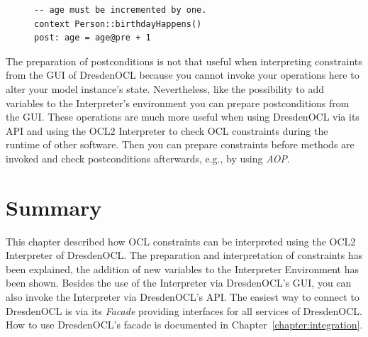 \begin{figure}[!t]
  \lstset{
    language=OCL
  }
  \begin{lstlisting}[caption={An example Postcondition that must be prepared.}, captionpos=b, label=lst:interpret:postcondition]
-- age must be incremented by one.
context Person::birthdayHappens()
post: age = age@pre + 1
  \end{lstlisting}
\end{figure}

The preparation of postconditions is not that useful when interpreting constraints from the GUI of DresdenOCL because you cannot invoke your operations here to alter your model instance's state. Nevertheless, like the possibility to add variables to the Interpreter's environment you can prepare postconditions from the GUI. These operations are much more useful when using DresdenOCL via its API and using the \acs{OCL}2 Interpreter to check \acs{OCL} constraints during the runtime of other software. Then you can prepare constraints before methods are invoked and check postconditions afterwards, e.g., by using \emph{\acf{AOP}}.



\section{Summary}
  
This chapter described how \acs{OCL} constraints can be interpreted using the \acs{OCL}2 Interpreter of DresdenOCL. The preparation and interpretation of constraints has been explained, the addition of new variables to the Interpreter Environment has been shown. Besides the use of the Interpreter via DresdenOCL's GUI, you can also invoke the Interpreter via DresdenOCL's \acs{API}. The easiest way to connect to DresdenOCL is via its \emph{Facade} providing interfaces for all services of DresdenOCL. How to use DresdenOCL's facade is documented in Chapter~\ref{chapter:integration}.